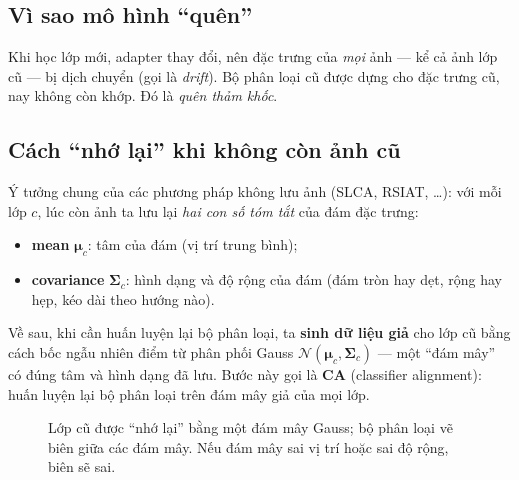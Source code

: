 \documentclass[11pt]{article}
\newcommand{\bmu}{\boldsymbol{\mu}}
\newcommand{\bSigma}{\boldsymbol{\Sigma}}
\begin{document}
\subsection{Vì sao mô hình ``quên''}
Khi học lớp mới, adapter thay đổi, nên đặc trưng của \emph{mọi} ảnh --- kể cả ảnh lớp cũ --- bị dịch chuyển (gọi là
\emph{drift}). Bộ phân loại cũ được dựng cho đặc trưng cũ, nay không còn khớp. Đó là \emph{quên thảm khốc}.

\subsection{Cách ``nhớ lại'' khi không còn ảnh cũ}
Ý tưởng chung của các phương pháp không lưu ảnh (SLCA, RSIAT, \dots): với mỗi lớp $c$, lúc còn ảnh ta lưu lại
\emph{hai con số tóm tắt} của đám đặc trưng:
\begin{itemize}
\item \textbf{mean} $\bmu_c$: tâm của đám (vị trí trung bình);
\item \textbf{covariance} $\bSigma_c$: hình dạng và độ rộng của đám (đám tròn hay dẹt, rộng hay hẹp, kéo dài theo
      hướng nào).
\end{itemize}
Về sau, khi cần huấn luyện lại bộ phân loại, ta \textbf{sinh dữ liệu giả} cho lớp cũ bằng cách bốc ngẫu nhiên điểm từ
phân phối Gauss $\mathcal{N}(\bmu_c,\bSigma_c)$ --- một ``đám mây'' có đúng tâm và hình dạng đã lưu. Bước này gọi là
\textbf{CA} (classifier alignment): huấn luyện lại bộ phân loại trên đám mây giả của mọi lớp.

\begin{figure}[H]
\centering
{}
\caption{Lớp cũ được ``nhớ lại'' bằng một đám mây Gauss; bộ phân loại vẽ biên giữa các đám mây. Nếu đám mây sai vị trí
hoặc sai độ rộng, biên sẽ sai.}
\end{figure}
\end{document}

